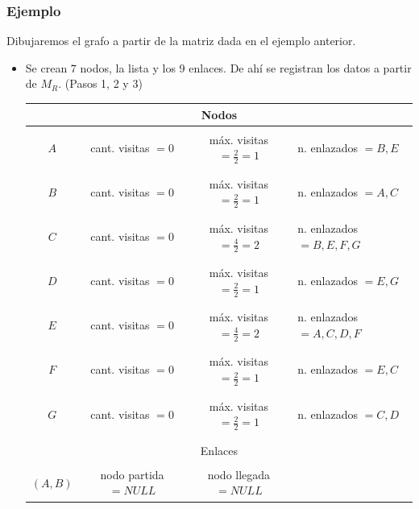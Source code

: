 \documentclass[12pt]{article}
\begin{document}
\subsubsection{Ejemplo}
Dibujaremos el grafo a partir de la matriz dada en el ejemplo anterior.
\begin{itemize}
\item Se crean $7$ nodos, la lista y los 9 enlaces. De ahí se registran los datos a partir de $M_{R}$. (Pasos 1, 2 y 3)\\
\begin{tabular}{ c  c  c  l }
\multicolumn{4}{c}{Nodos}\\
\hline
\\[-0.8em]
$A$ & cant. visitas $=0$  & m\'{a}x. visitas $=\frac{2}{2}=1$ & n. enlazados $={B,E}$\\
\\[-0.8em]
\hline
\\[-0.8em]
$B$ & cant. visitas $=0$  & m\'{a}x. visitas $=\frac{2}{2}=1$ & n. enlazados $={A,C}$\\
\\[-0.8em]
\hline
\\[-0.8em]
$C$ & cant. visitas $=0$  & m\'{a}x. visitas $=\frac{4}{2}=2$ & n. enlazados $={B,E,F,G}$\\
\\[-0.8em]
\hline
\\[-0.8em]
$D$ & cant. visitas $=0$  & m\'{a}x. visitas $=\frac{2}{2}=1$ & n. enlazados $={E,G}$\\
\\[-0.8em]
\hline
\\[-0.8em]
$E$ & cant. visitas $=0$  & m\'{a}x. visitas $=\frac{4}{2}=2$ & n. enlazados $={A,C,D,F}$\\
\\[-0.8em]
\hline
\\[-0.8em]
$F$ & cant. visitas $=0$  & m\'{a}x. visitas $=\frac{2}{2}=1$ & n. enlazados $={E,C}$\\
\\[-0.8em]
\hline
\\[-0.8em]
$G$ & cant. visitas $=0$  & m\'{a}x. visitas $=\frac{2}{2}=1$ & n. enlazados $={C,D}$\\
\\[-0.8em]
\hline
\\
\multicolumn{4}{c}{Enlaces}\\
\hline
\\[-0.8em]
$(A,B)$ & nodo partida $=NULL$ & nodo llegada $=NULL$ & \\
\hline

\end{tabular}
\end{itemize}
\end{document}

